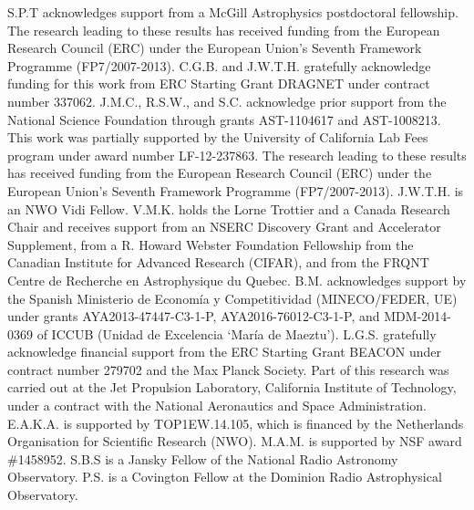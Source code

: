 \documentclass[twocolumn]{aastex61}
\begin{document}
S.P.T acknowledges support from a McGill Astrophysics postdoctoral fellowship. The research leading to these results has received funding from the European Research Council (ERC) under the European Union's Seventh Framework Programme (FP7/2007-2013). C.G.B. and J.W.T.H. gratefully acknowledge funding for this work from ERC Starting Grant DRAGNET under contract number 337062. J.M.C., R.S.W., and S.C. acknowledge prior support from the National Science Foundation through grants AST-1104617 and AST-1008213. This work was partially supported by the University of California Lab Fees program under award number LF-12-237863. The research leading to these results has received funding from the European Research Council (ERC) under the European Union’s Seventh Framework Programme (FP7/2007-2013).  J.W.T.H. is an NWO Vidi Fellow. V.M.K. holds the Lorne Trottier and a Canada Research Chair and receives support from an NSERC Discovery Grant and Accelerator Supplement, from a R. Howard Webster Foundation Fellowship from the Canadian Institute for Advanced Research (CIFAR), and from the FRQNT Centre de Recherche en Astrophysique du Quebec. B.M. acknowledges support by the Spanish Ministerio de Econom\'ia y Competitividad (MINECO/FEDER, UE) under grants AYA2013-47447-C3-1-P, AYA2016-76012-C3-1-P, and MDM-2014-0369 of ICCUB (Unidad de Excelencia `Mar\'ia de Maeztu'). L.G.S. gratefully acknowledge financial support from the ERC Starting Grant BEACON under contract number 279702 and the Max Planck Society. Part of this research was carried out at the Jet Propulsion Laboratory, California Institute of Technology, under a contract with the National Aeronautics and Space Administration. E.A.K.A. is supported by TOP1EW.14.105, which is financed by the Netherlands Organisation for Scientific Research (NWO). M.A.M. is supported by NSF award \#1458952. S.B.S is a Jansky Fellow of the National Radio Astronomy Observatory. P.S. is a Covington Fellow at the Dominion Radio Astrophysical Observatory.


%
\end{document}
